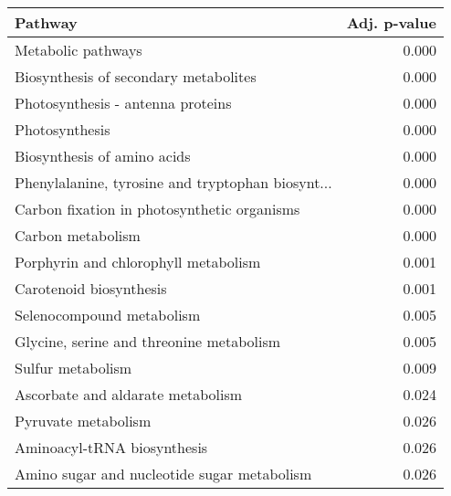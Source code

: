 \begin{tabular}{lr}
\toprule
                                           Pathway &  Adj. p-value \\
\midrule
                                Metabolic pathways &         0.000 \\
             Biosynthesis of secondary metabolites &         0.000 \\
                 Photosynthesis - antenna proteins &         0.000 \\
                                    Photosynthesis &         0.000 \\
                       Biosynthesis of amino acids &         0.000 \\
 Phenylalanine, tyrosine and tryptophan biosynt... &         0.000 \\
       Carbon fixation in photosynthetic organisms &         0.000 \\
                                 Carbon metabolism &         0.000 \\
              Porphyrin and chlorophyll metabolism &         0.001 \\
                           Carotenoid biosynthesis &         0.001 \\
                         Selenocompound metabolism &         0.005 \\
          Glycine, serine and threonine metabolism &         0.005 \\
                                 Sulfur metabolism &         0.009 \\
                 Ascorbate and aldarate metabolism &         0.024 \\
                               Pyruvate metabolism &         0.026 \\
                       Aminoacyl-tRNA biosynthesis &         0.026 \\
       Amino sugar and nucleotide sugar metabolism &         0.026 \\
\bottomrule
\end{tabular}
